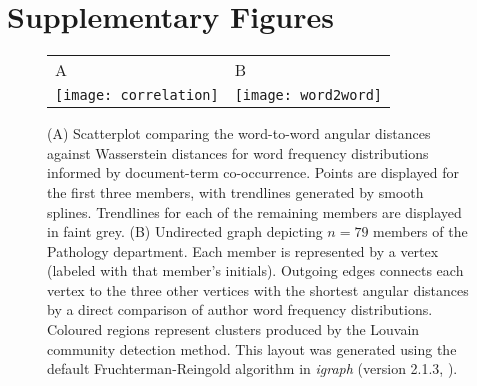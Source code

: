 \documentclass[12pt]{article}
\begin{document}








\clearpage





\clearpage 
\section * {Supplementary Figures}

\renewcommand{\thefigure}{S\arabic{figure}}
\setcounter{figure}{0}

\begin{figure}[htbp]
\centering
\begin{tabular}{ll}
{\large A} & {\large B} \\[-24pt]
\texttt{[image: correlation]} & 
\texttt{[image: word2word]}\\
\end{tabular}
\caption{
(A) Scatterplot comparing the word-to-word angular distances against Wasserstein distances for word frequency distributions informed by document-term co-occurrence.
Points are displayed for the first three members, with trendlines generated by smooth splines.
Trendlines for each of the remaining members are displayed in faint grey.
(B) Undirected graph depicting $n=79$ members of the Pathology department.
Each member is represented by a vertex (labeled with that member's initials). 
Outgoing edges connects each vertex to the three other vertices with the shortest angular distances by a direct comparison of author word frequency distributions.
Coloured regions represent clusters produced by the Louvain community detection method.
This layout was generated using the default Fruchterman-Reingold algorithm in \textit{igraph} (version 2.1.3, \citet{gabor2025igraph}).
}
\label{fig:word2word}
\end{figure}
\end{document}
